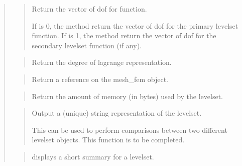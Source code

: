 \documentclass[a4paper,11pt,english]{sphinxmanual}
\begin{document}
\begin{quote}

\begin{quote}

Return the vector of dof for  function.

If  is 0, the method return the vector of dof for the primary
level\sphinxhyphen{}set function. If  is 1, the method return the vector of
dof for the secondary level\sphinxhyphen{}set function (if any).
\end{quote}

\begin{quote}

Return the degree of lagrange representation.
\end{quote}

\begin{quote}

Return a reference on the mesh\_fem object.
\end{quote}

\begin{quote}

Return the amount of memory (in bytes) used by the level\sphinxhyphen{}set.
\end{quote}

\begin{quote}

Output a (unique) string representation of the levelset.

This can be used to perform comparisons between two
different levelset objects.
This function is to be completed.
\end{quote}

\begin{quote}

displays a short summary for a levelset.
\end{quote}
\end{quote}
\end{document}
